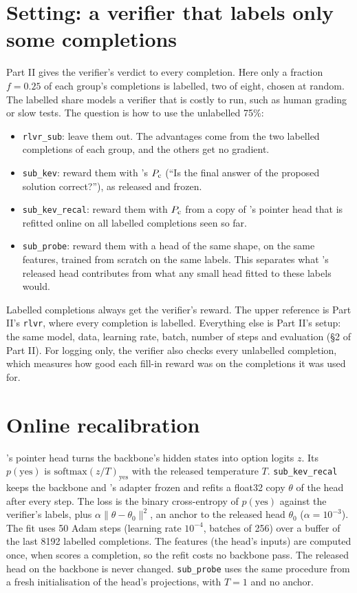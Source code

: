 
\section{Setting: a verifier that labels only some completions}\label{sec:setting}

Part II gives the verifier's verdict to every completion. Here only a fraction $f=0.25$ of each group's completions is
labelled, two of eight, chosen at random. The labelled share models a verifier that is costly to run, such as human
grading or slow tests. The question is how to use the unlabelled 75\%:
\begin{itemize}
\item \texttt{rlvr\_sub}: leave them out. The advantages come from the two labelled completions of each group, and the
  others get no gradient.
\item \texttt{sub\_kev}: reward them with \kev{}'s $P_{\mathrm{c}}$ (``Is the final answer of the proposed solution correct?''), as
  released and frozen.
\item \texttt{sub\_kev\_recal}: reward them with $P_{\mathrm{c}}$ from a copy of \kev{}'s pointer head that is refitted online on
  all labelled completions seen so far.
\item \texttt{sub\_probe}: reward them with a head of the same shape, on the same features, trained from scratch on the
  same labels. This separates what \kev{}'s released head contributes from what any small head fitted to these labels
  would.
\end{itemize}
Labelled completions always get the verifier's reward. The upper reference is Part II's \texttt{rlvr}, where every
completion is labelled. Everything else is Part II's setup: the same model, data, learning rate, batch, number of steps
and evaluation (\S2 of Part II). For logging only, the verifier also checks every unlabelled completion, which measures
how good each fill-in reward was on the completions it was used for.

\section{Online recalibration}\label{sec:recal}

\kev{}'s pointer head turns the backbone's hidden states into option logits $z$. Its $p(\text{yes})$ is
$\mathrm{softmax}(z/T)_{\text{yes}}$ with the released temperature $T$. \texttt{sub\_kev\_recal} keeps the backbone and
\kev{}'s adapter frozen and refits a float32 copy $\theta$ of the head after every step. The loss is the binary
cross-entropy of $p(\text{yes})$ against the verifier's labels, plus $\alpha\lVert\theta-\theta_0\rVert^2$, an anchor to
the released head $\theta_0$ ($\alpha=10^{-3}$). The fit uses 50 Adam steps (learning rate $10^{-4}$, batches of 256)
over a buffer of the last 8192 labelled completions. The features (the head's inputs) are computed once, when \kev{}
scores a completion, so the refit costs no backbone pass. The released head on the backbone is never changed.
\texttt{sub\_probe} uses the same procedure from a fresh initialisation of the head's projections, with $T=1$ and no
anchor.

